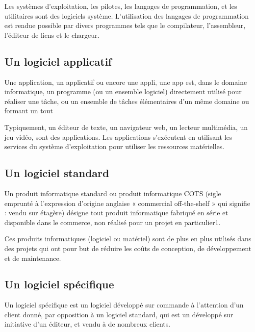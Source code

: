 Les systèmes d'exploitation, les pilotes, les langages de programmation, et les utilitaires sont
des logiciels système. L'utilisation des langages de programmation est rendue possible par divers
programmes tels que le compilateur, l'assembleur, l'éditeur de liens et le chargeur.

\subsection{Un logiciel applicatif}\label{subsec:logiciel-applicatif}
Une application, un applicatif\cite{application_informatique} ou encore une appli, une app est, dans le domaine informatique,
un programme (ou un ensemble logiciel) directement utilisé pour réaliser une tâche, ou un ensemble de
tâches élémentaires d'un même domaine ou formant un tout

Typiquement, un éditeur de texte, un navigateur web, un lecteur multimédia, un jeu vidéo, sont des
applications. Les applications s'exécutent en utilisant les services du système d'exploitation
pour utiliser les ressources matérielles.

\subsection{Un logiciel standard}\label{subsec:logiciel-standard}
Un produit informatique standard ou produit informatique COTS (sigle emprunté à l'expression
d'origine anglaise « commercial off-the-shelf » qui signifie : vendu sur étagère)
désigne tout produit informatique fabriqué en série et disponible dans le commerce,
non réalisé pour un projet en particulier1.

Ces produits informatiques (logiciel ou matériel) sont de plus en plus utilisés dans des
projets qui ont pour but de réduire les coûts de conception, de développement et de maintenance.

\subsection{Un logiciel spécifique}\label{subsec:logiciel-specifique}
Un logiciel spécifique\cite{logiciel_specifique} est un logiciel développé sur commande à l'attention
d'un client donné, par opposition à un logiciel standard, qui est un développé sur initiative
d'un éditeur, et vendu à de nombreux clients.

